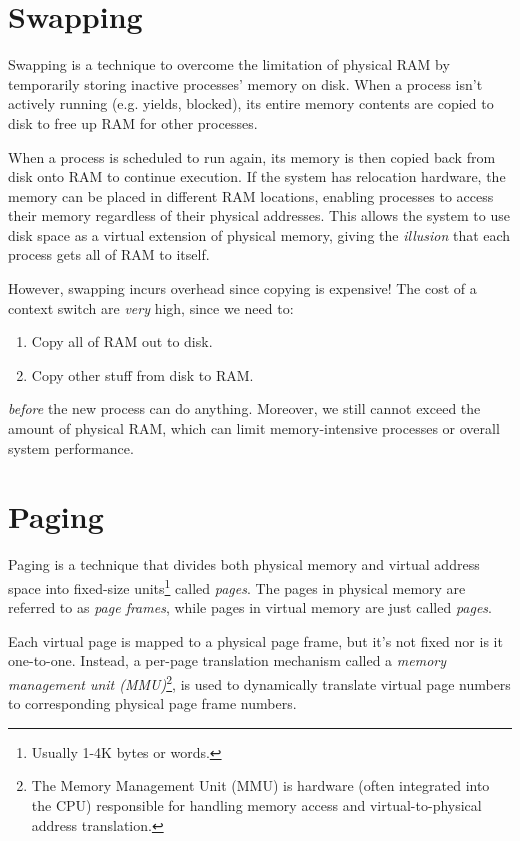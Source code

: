 \documentclass{report}
\begin{document}
\section{Swapping}
Swapping is a technique to overcome the limitation of physical RAM by temporarily storing inactive
processes' memory on disk. When a process isn't actively running (e.g. yields, blocked), its entire
memory contents are copied to disk to free up RAM for other processes.

When a process is scheduled to run again, its memory is then copied back from disk onto RAM to
continue execution. If the system has relocation hardware, the memory can be placed in different RAM
locations, enabling processes to access their memory regardless of their physical addresses. This
allows the system to use disk space as a virtual extension of physical memory, giving the 
\textit{illusion} that each process gets all of RAM to itself. 

However, swapping incurs overhead since copying is expensive! The cost of a context switch are
\textit{very} high, since we need to:

\begin{enumerate}[label=\textit{(\roman*)}]
\item Copy all of RAM out to disk.
\item Copy other stuff from disk to RAM.
\end{enumerate}
\textit{before} the new process can do anything. Moreover, we still cannot exceed the amount of
physical RAM, which can limit memory-intensive processes or overall system performance.


\section{Paging}
Paging is a technique that divides both physical memory and virtual address space into fixed-size
units\footnote{Usually 1-4K bytes or words.} called \textit{pages}. The pages in physical memory are
referred to as \textit{page frames}, while pages in virtual memory are just called \textit{pages}.

Each virtual page is mapped to a physical page frame, but it's not fixed nor is it
one-to-one. Instead, a per-page translation mechanism called a \textit{memory management unit
  (MMU)}\footnote{The Memory Management Unit (MMU) is hardware (often integrated into the CPU)
  responsible for handling memory access and virtual-to-physical address translation.},
is used to dynamically translate virtual page numbers to corresponding physical page frame
numbers. 
\end{document}
